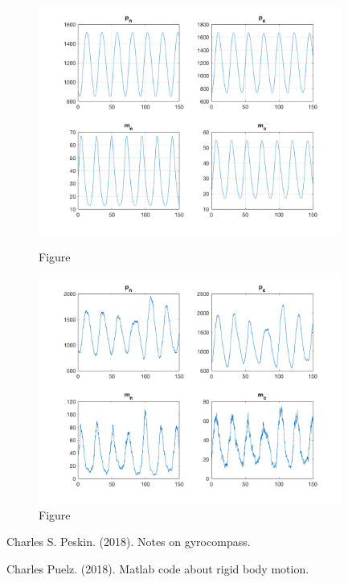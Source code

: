 \documentclass[12pt]{article}
\renewcommand{\(}{\left (}
\renewcommand{\)}{\right )}
\begin{document}
\begin{figure}[h]
    \centering
	\begin{minipage}{0.45\textwidth}
		\centering
		\includegraphics[width=0.89\textwidth]{single_oscillator_zoom_out.png}
		\caption*{\small Figure}
	\end{minipage}
	\begin{minipage}{0.45\textwidth}
		\centering
		\includegraphics[width=0.89\textwidth]{sto_single_oscillator_zoom_out.png}
		\caption*{\small Figure}
	\end{minipage}
\end{figure}


\begin{thebibliography}{9}

	Charles S. Peskin. (2018).
	Notes on gyrocompass.

	Charles Puelz. (2018).
	Matlab code about rigid body motion.




\end{thebibliography}
\end{document}
